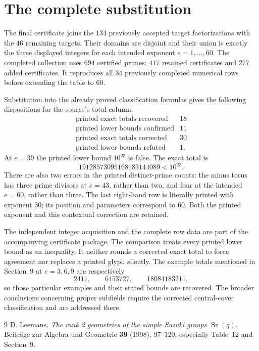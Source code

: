 \documentclass[11pt]{article}
\begin{document}
\section{The complete substitution}
The final certificate joins the $134$ previously accepted target
factorizations with the $46$ remaining targets. Their domains are disjoint
and their union is exactly the three displayed integers for each intended
exponent $e=1,\ldots,60$. The completed collection uses $694$ certified primes:
$417$ retained certificates and $277$ added certificates. It reproduces all
$34$ previously completed numerical rows before extending the table to $60$.

Substitution into the already proved classification formulas gives the
following dispositions for the source's total column:
\[
\begin{array}{lr}
\text{printed exact totals recovered}&18\\
\text{printed lower bounds confirmed}&11\\
\text{printed exact totals corrected}&30\\
\text{printed lower bounds refuted}&1.
\end{array}
\]
At $e=39$ the printed lower bound $10^{23}$ is false. The exact total is
\[
                 19128573095168183144089<10^{23}.
\]
There are also two errors in the printed distinct-prime counts: the minus
torus has three prime divisors at $e=43$, rather than two, and four at the
intended $e=60$, rather than three. The last right-hand row is literally
printed with exponent $30$; its position and parameters correspond to
$60$. Both the printed exponent and this contextual correction are retained.

The independent integer acquisition and the complete row data are part of
the accompanying certificate package. The comparison treats every printed
lower bound as an inequality. It neither rounds a corrected exact total to
force agreement nor replaces a printed glyph silently. The example totals
mentioned in Section~9 at $e=3,6,9$ are respectively
\[
2411,\qquad6453727,\qquad18084183211,
\]
so those particular examples and their stated bounds are recovered. The
broader conclusions concerning proper subfields require the corrected
central-cover classification and are addressed there.

\begin{thebibliography}{9}
 D. Leemans, \emph{The rank 2 geometries of the simple Suzuki
groups $\operatorname{Sz}(q)$}, Beitr\"age zur Algebra und Geometrie
\textbf{39} (1998), 97--120, especially Table~12 and Section~9.
\end{thebibliography}
\end{document}
